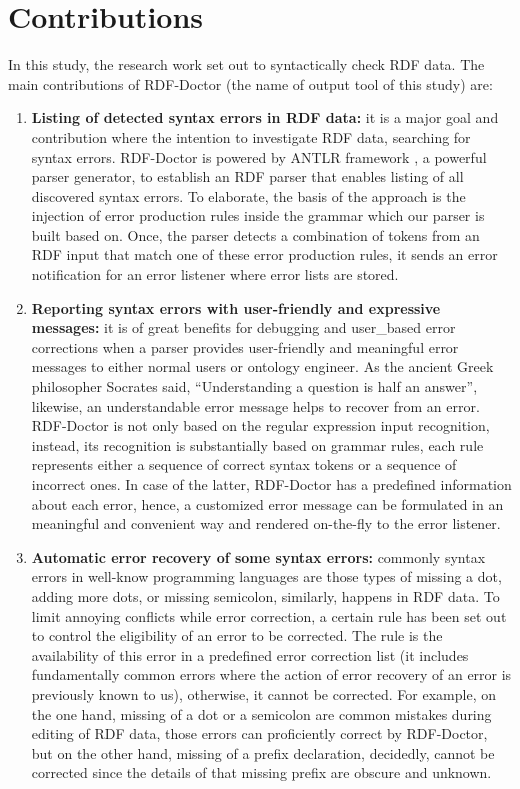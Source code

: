 \section {Contributions}
In this study, the research work set out to syntactically check RDF data. 
The main contributions of RDF-Doctor (the name of output tool of this study) are:
\begin{enumerate}
	\item  {\bf Listing of detected syntax errors in RDF data:} it is a major goal and contribution where the intention to investigate RDF data, searching for syntax errors. RDF-Doctor is powered by ANTLR framework \cite{ANTLR:Website:Online}, a powerful parser generator, to establish an RDF parser that enables listing of all discovered syntax errors. To elaborate, the basis of the approach is the injection of error production rules inside the grammar which our parser is built based on. Once, the parser detects a combination of tokens from an RDF input that match one of these error production rules, it sends an error notification for an error listener where error lists are stored.
	\item {\bf Reporting syntax errors with user-friendly and expressive messages:} it is of great benefits for debugging and user\_based error corrections when a parser provides user-friendly and meaningful error messages to either normal users or ontology engineer. As the ancient Greek philosopher Socrates said, “Understanding a question is half an answer”\cite{Socrates:quote:Online}, likewise, an understandable error message helps to recover from an error.  RDF-Doctor is not only based on the regular expression input recognition, instead, its recognition is substantially based on grammar rules, each rule represents either a sequence of correct syntax tokens or a sequence of incorrect ones. In case of the latter, RDF-Doctor has a predefined information about each error, hence,  a customized error message can be formulated in an meaningful and convenient way and rendered on-the-fly to the error listener.  
	\item {\bf Automatic error recovery of some syntax errors:} commonly syntax errors in well-know programming languages are those types of missing a dot, adding more dots, or missing semicolon, similarly, happens in RDF data. To limit annoying conflicts while error correction, a certain rule has been set out to control the eligibility of an error to be corrected. The rule is the availability of this error in a predefined error correction list (it includes fundamentally common errors where the action of error recovery of an error is previously known to us), otherwise, it cannot be corrected. For example, on the one hand,  missing of a dot or a semicolon are common mistakes during editing of RDF data, those errors can proficiently correct by RDF-Doctor, but on the other hand, missing of a prefix declaration, decidedly, cannot be corrected since the details of that missing prefix are obscure and unknown.     
\end{enumerate}

